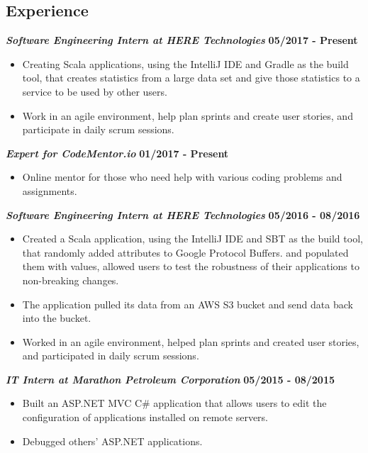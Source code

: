 \documentclass[10pt]{res}
\begin{document}
\begin{resume}
\section{Experience}
	\textbf{\textit{Software Engineering Intern at HERE Technologies}}
	\vspace*{.25em}
	\hfill{\bf 05/2017 - Present}
	\begin{itemize}
		\item Creating Scala applications, using the IntelliJ IDE and Gradle as the build tool, that creates statistics from a large data set and give those statistics to a service to be used by other users. 
\item Work in an agile environment, help plan sprints and create user stories, and participate in daily scrum sessions. 
	\end{itemize}
\textbf{\textit{Expert for CodeMentor.io}}
	\vspace*{.25em}
	\hfill{\bf 01/2017 - Present}
	\begin{itemize}
		\item Online mentor for those who need help with various coding problems and assignments. 
	\end{itemize}
	\textbf{\textit{Software Engineering Intern at HERE Technologies}}
	\vspace*{.25em}
	\hfill {\bf 05/2016 - 08/2016}
	\begin{itemize}
	  \item Created a Scala application, using the IntelliJ IDE and SBT as the build tool, that randomly added attributes to Google Protocol Buffers. 
 and populated them with values, allowed users to test the robustness of their applications to non-breaking changes.
	\item The application pulled its data from an AWS S3 bucket and send data back into the bucket.
\item Worked in an agile environment, helped plan sprints and created user stories, and participated in daily scrum sessions. 
	\end{itemize}  
	\textbf{\textit{IT Intern at Marathon Petroleum Corporation}} \hfill {\bf 05/2015 - 08/2015}
	\vspace*{.25em}
	\begin{itemize}
  \setlength\itemsep{0em}
	  \item Built an ASP.NET MVC C\# application that allows users to edit the configuration of applications installed on remote servers.
	  \item Debugged others' ASP.NET applications.
\end{itemize}


\end{resume}
\end{document}
